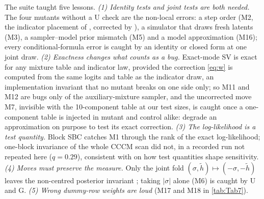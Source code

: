 The suite taught five lessons.
\emph{(1) Identity tests and joint tests are both needed.} The four mutants without a U check are
the non-local errors: a step order (M2, the indicator placement of \citet{primiceri2005time}, corrected by
\citet{delnegro2015time}), a simulator that draws fresh
latents (M3), a sampler--model prior mismatch (M5) and a model approximation (M16); every
conditional-formula error is caught by an identity or closed form at one joint draw. %
\emph{(2) Exactness changes what counts as a bug.} Exact-mode SV is exact for any mixture table and
indicator law, provided the correction \eqref{eq:w} is computed from the same logits and table as
the indicator draw, an implementation invariant that no mutant breaks on one side only; so M11 and
M12 are bugs only of the auxiliary-mixture sampler, and the uncorrected move M7, invisible with the 10-component table
at our test sizes, is caught once a one-component table is injected in mutant and control alike:
degrade an approximation on purpose to test its exact correction. %
\emph{(3) The log-likelihood is a test quantity.} Block SBC catches M1 through the rank of the
exact log-likelihood; one-block invariance of the whole CCCM scan did not, in a recorded run not
repeated here ($q = 0.29$), consistent with \citet{modrak2025simulation} on how test quantities
shape sensitivity. %
\emph{(4) Moves must preserve the measure.} Only the joint fold
$(\sigma, \tilde h) \mapsto (-\sigma, -\tilde h)$ leaves the non-centred posterior invariant
\citep{fruhwirth2010stochastic}; taking $|\sigma|$ alone (M6) is caught by U and G. %
\emph{(5) Wrong dummy-row weights are loud} (M17 and M18 in \cref{tab:Tab7}). %

